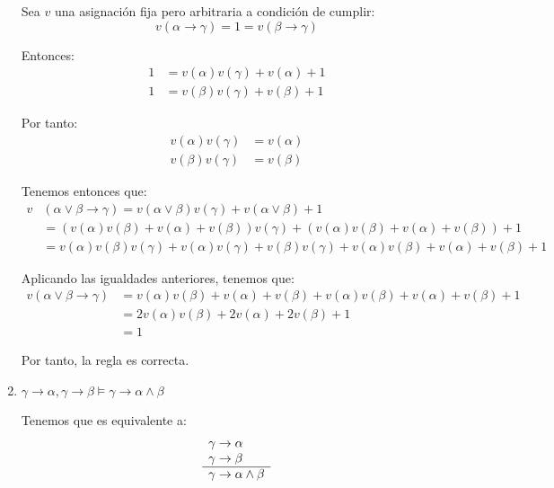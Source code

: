\begin{ejercicio*}
\begin{enumerate}
        Sea $v$ una asignación fija pero arbitraria a condición de cumplir:
        \begin{equation*}
            v(\alpha\rightarrow\gamma)=1=v(\beta\rightarrow\gamma)
        \end{equation*}

        Entonces:
        \begin{align*}
            1 &= v(\alpha)v(\gamma)+v(\alpha)+1\\
            1 &= v(\beta)v(\gamma)+v(\beta)+1
        \end{align*}

        Por tanto:
        \begin{align*}
            v(\alpha)v(\gamma) &= v(\alpha) \\
            v(\beta)v(\gamma) &= v(\beta)
        \end{align*}

        Tenemos entonces que:
        \begin{align*}
            v &(\alpha\lor\beta\rightarrow\gamma)
            = v(\alpha\lor\beta)v(\gamma)+v(\alpha\lor\beta)+1\\
            &= (v(\alpha)v(\beta)+v(\alpha)+v(\beta))v(\gamma) + (v(\alpha)v(\beta)+v(\alpha)+v(\beta))+1\\
            &= v(\alpha)v(\beta)v(\gamma)+v(\alpha)v(\gamma)+v(\beta)v(\gamma) + v(\alpha)v(\beta)+v(\alpha)+v(\beta)+1
        \end{align*}

        Aplicando las igualdades anteriores, tenemos que:
        \begin{align*}
            v (\alpha\lor\beta\rightarrow\gamma)
            &= v(\alpha)v(\beta)+v(\alpha)+v(\beta) + v(\alpha)v(\beta)+v(\alpha)+v(\beta)+1 \\
            &= 2v(\alpha)v(\beta)+2v(\alpha)+2v(\beta)+1 \\
            &= 1
        \end{align*}

        Por tanto, la regla es correcta.

        \item $\gamma\rightarrow\alpha, \gamma\rightarrow\beta \vDash \gamma\rightarrow\alpha\land\beta$

        Tenemos que es equivalente a:
        \begin{equation*}
            \begin{array}{l}
                \gamma\rightarrow\alpha\\
                \gamma\rightarrow\beta\\ \hline
                \multicolumn{1}{c}{\gamma\rightarrow\alpha\land\beta}
            \end{array}
        \end{equation*}


\end{enumerate}
\end{ejercicio*}
